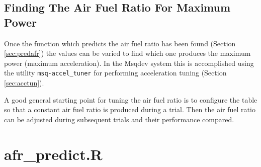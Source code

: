 \documentclass{article}
\begin{document}
\FloatBarrier  %

\subsection{Finding The Air Fuel Ratio For Maximum Power}
\label{sec:findafrpow}

Once the function which predicts the air fuel ratio has been found
(Section \ref{sec:predafr}) the values can be varied to find which
one produces the maximum power (maximum acceleration).
In the Msqdev system this is accomplished using the utility
\verb+msq-accel_tuner+ for performing acceleration tuning (Section \ref{sec:acctun}).

A good general starting point for tuning the air fuel ratio is to
configure the table so that a constant air fuel ratio is produced
during a trial.
Then the air fuel ratio can be adjusted during subsequent trials and
their performance compared.

\appendix
\section{afr\_predict.R}
\label{app:afrpred}



\pagebreak


%
%
%

\end{document}
